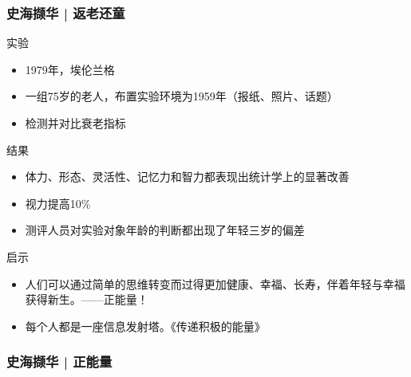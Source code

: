\begin{frame}
  \frametitle{史海撷华 | 返老还童}
  \begin{block}{实验}
    \begin{itemize}
      \item 1979年，埃伦\textbullet 兰格
      \item 一组75岁的老人，布置实验环境为1959年（报纸、照片、话题）
      \item 检测并对比衰老指标
    \end{itemize}
  \end{block}
  \vspace{-0.3em}
  \pause
  \begin{block}{结果}
    \begin{itemize}
      \item 体力、形态、灵活性、记忆力和智力都表现出统计学上的显著改善
      \item 视力提高10\%
      \item 测评人员对实验对象年龄的判断都出现了年轻三岁的偏差
    \end{itemize}
  \end{block}
  \vspace{-0.3em}
  \pause
  \begin{block}{启示}
    \begin{itemize}
      \item \alert{人们可以通过简单的思维转变而过得更加健康、幸福、长寿}，伴着年轻与幸福获得新生。——正能量！
      \item 每个人都是一座信息发射塔。《传递积极的能量》
    \end{itemize}
  \end{block}
\end{frame}

\begin{frame}
  \frametitle{史海撷华 | 正能量}
  \begin{figure}
    \centering
    \qquad
    \\
    \vspace{1em}
    \qquad
    \\
  \end{figure}
\end{frame}

